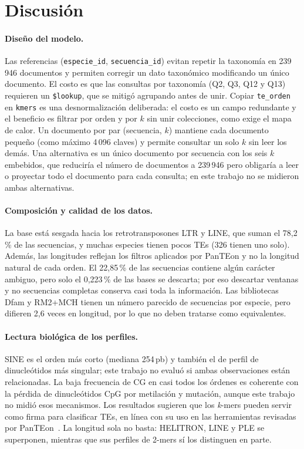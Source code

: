 \section{Discusión}
 
\paragraph{Diseño del modelo.}
Las referencias (\texttt{especie\_id}, \texttt{secuencia\_id}) evitan
repetir la taxonomía en 239\,946 documentos y permiten corregir un dato
taxonómico modificando un único documento. El costo es que las consultas
por taxonomía (Q2, Q3, Q12 y Q13) requieren un \texttt{\$lookup}, que se
mitigó agrupando antes de unir. Copiar \texttt{te\_orden} en
\texttt{kmers} es una desnormalización deliberada: el costo es un campo
redundante y el beneficio es filtrar por orden y por $k$ sin unir
colecciones, como exige el mapa de calor. Un documento por par
(secuencia, $k$) mantiene cada documento pequeño (como máximo 4\,096
claves) y permite consultar un solo $k$ sin leer los demás. Una
alternativa es un único documento por secuencia con los seis $k$
embebidos, que reduciría el número de documentos a 239\,946 pero obligaría
a leer o proyectar todo el documento para cada consulta; en este trabajo
no se midieron ambas alternativas.
 
\paragraph{Composición y calidad de los datos.}
La base está sesgada hacia los retrotransposones LTR y LINE, que suman
el 78,2\,\% de las secuencias, y muchas especies tienen pocos TEs (326
tienen uno solo). Además, las longitudes reflejan los filtros aplicados
por PanTEon y no la longitud natural de cada orden. El 22,85\,\% de las
secuencias contiene algún carácter ambiguo, pero solo el 0,223\,\% de las
bases se descarta; por eso descartar ventanas y no secuencias completas
conserva casi toda la información. Las bibliotecas Dfam y RM2+MCH tienen
un número parecido de secuencias por especie, pero difieren 2,6 veces en
longitud, por lo que no deben tratarse como equivalentes.
 
\paragraph{Lectura biológica de los perfiles.}
SINE es el orden más corto (mediana 254\,pb) y también el de perfil de
dinucleótidos más singular; este trabajo no evaluó si ambas
observaciones están relacionadas. La baja frecuencia de CG en casi todos
los órdenes es coherente con la pérdida de dinucleótidos CpG por
metilación y mutación, aunque este trabajo no midió esos mecanismos. Los
resultados sugieren que los \textit{k}-mers pueden servir como firma para
clasificar TEs, en línea con su uso en las herramientas revisadas por
PanTEon~\cite{orozcoarias2026panteon}. La longitud sola no basta: HELITRON,
LINE y PLE se superponen, mientras que sus perfiles de 2-mers sí los
distinguen en parte.
 
